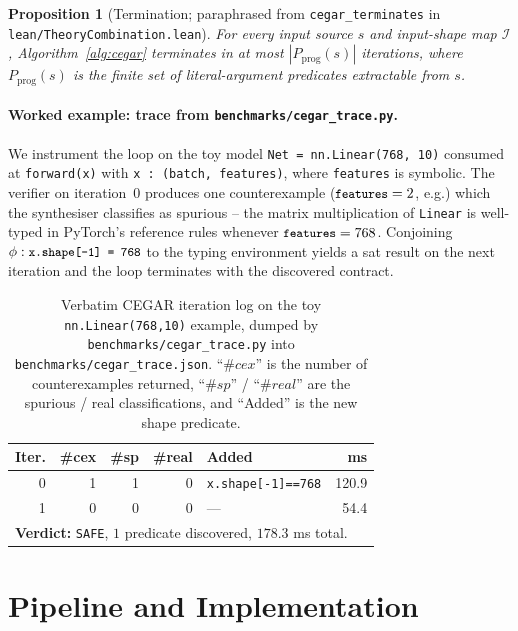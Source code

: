\documentclass{article}
\theoremstyle{plain}
\newtheorem{proposition}[theorem]{Proposition}
\theoremstyle{definition}
\newcommand{\code}[1]{\texttt{\small #1}}
\begin{document}
\begin{proposition}[Termination; paraphrased from
\code{cegar\_terminates} in \code{lean/TheoryCombination.lean}]
For every input source $s$ and input-shape map $\mathcal{I}$,
Algorithm~\ref{alg:cegar} terminates in at most
$|P_\text{prog}(s)|$ iterations, where $P_\text{prog}(s)$ is the
finite set of literal-argument predicates extractable from $s$.
\end{proposition}

\paragraph{Worked example: trace from \code{benchmarks/cegar\_trace.py}.}
We instrument the loop on the toy model
\code{Net = nn.Linear(768, 10)} consumed at \code{forward(x)} with
\code{x : (batch, features)}, where \code{features} is symbolic.
The verifier on iteration~$0$ produces one counterexample
($\code{features}=2$, e.g.) which the synthesiser classifies as
spurious -- the matrix multiplication of \code{Linear} is well-typed
in PyTorch's reference rules whenever
$\code{features} = 768$.  Conjoining $\phi : \code{x.shape[-1] = 768}$
to the typing environment yields a sat result on the next iteration
and the loop terminates with the discovered contract.

\begin{table}[t]
\centering\small
\caption{Verbatim CEGAR iteration log on the toy
\code{nn.Linear(768,10)} example, dumped by
\code{benchmarks/cegar\_trace.py} into
\code{benchmarks/cegar\_trace.json}.  ``$\#cex$'' is the number of
counterexamples returned, ``$\#sp$'' / ``$\#real$'' are the spurious
/ real classifications, and ``Added'' is the new shape predicate.}
\label{tab:cegartrace}
\begin{tabular}{rrrrlr}
\toprule
Iter. & \#cex & \#sp & \#real & Added & ms \\
\midrule
0 & 1 & 1 & 0 & \code{x.shape[-1]==768} & 120.9 \\
1 & 0 & 0 & 0 & --- & 54.4 \\
\midrule
\multicolumn{6}{l}{\textbf{Verdict:} \texttt{SAFE}, $1$ predicate
discovered, $178.3$ ms total.}\\
\bottomrule
\end{tabular}
\end{table}

\section{Pipeline and Implementation}\label{sec:pipeline}
\end{document}
